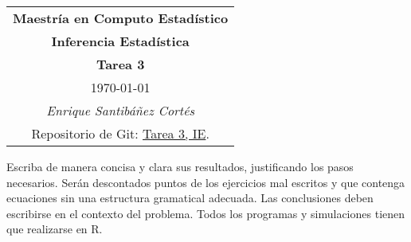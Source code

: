 \documentclass[11pt,letterpaper]{article}
\begin{document}
\begin{table}[ht]
\centering
\begin{tabular}{c}
\textbf{Maestría en Computo Estadístico}\\
\textbf{Inferencia Estadística} \\
\textbf{Tarea 3}\\
\today \\
\emph{Enrique Santibáñez Cortés}\\
Repositorio de Git: \href{https://github.com/Enriquesec/Inferencia_Estad-stica/tree/master/Tareas/Tarea_3}{Tarea 3, IE}.
\end{tabular}
\end{table}
Escriba de manera concisa y clara sus resultados, justificando los pasos necesarios. Serán descontados puntos de los ejercicios mal escritos y que contenga ecuaciones sin una estructura gramatical adecuada. Las conclusiones deben escribirse en el contexto del problema. Todos los programas y
simulaciones tienen que realizarse en R.\\
\end{document}
